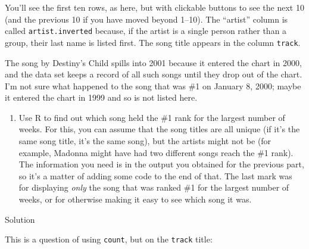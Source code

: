 \documentclass[]{tufte-book}
\newenvironment{Shaded}{}{}
\newcommand{\DataTypeTok}[1]{\textcolor[rgb]{0.56,0.13,0.00}{#1}}
\newcommand{\DecValTok}[1]{\textcolor[rgb]{0.25,0.63,0.44}{#1}}
\newcommand{\KeywordTok}[1]{\textcolor[rgb]{0.00,0.44,0.13}{\textbf{#1}}}
\newcommand{\NormalTok}[1]{#1}
\newcommand{\OperatorTok}[1]{\textcolor[rgb]{0.40,0.40,0.40}{#1}}
\newcommand{\StringTok}[1]{\textcolor[rgb]{0.25,0.44,0.63}{#1}}
\providecommand{\tightlist}{%
  \setlength{\itemsep}{0pt}\setlength{\parskip}{0pt}}
\theoremstyle{definition}
\theoremstyle{definition}
\theoremstyle{definition}
\theoremstyle{remark}
\begin{document}
You'll see the first ten rows, as here, but with clickable buttons to
see the next 10 (and the previous 10 if you have moved beyond 1--10).
The ``artist'' column is called \texttt{artist.inverted} because, if the
artist is a single person rather than a group, their last name is listed
first. The song title appears in the column \texttt{track}.

The song by Destiny's Child spills into 2001 because it entered the
chart in 2000, and the data set keeps a record of all such songs until
they drop out of the chart. I'm not sure what happened to the song that
was \#1 on January 8, 2000; maybe it entered the chart in 1999
 and so is not
listed here.

\begin{enumerate}
\def\labelenumi{(\alph{enumi})}
\setcounter{enumi}{6}
\tightlist
\item
  Use R to find out which song held the \#1 rank for the largest number
  of weeks. For this, you can assume that the song titles are all unique
  (if it's the same song title, it's the same song), but the artists
  might not be (for example, Madonna might have had two different songs
  reach the \#1 rank). The information you need is in the output you
  obtained for the previous part, so it's a matter of adding some code
  to the end of that. The last mark was for displaying \emph{only} the
  song that was ranked \#1 for the largest number of weeks, or for
  otherwise making it easy to see which song it was.
\end{enumerate}

Solution

This is a question of using \texttt{count}, but on the \texttt{track}
title:

\begin{Shaded}
\end{Shaded}
\end{document}
